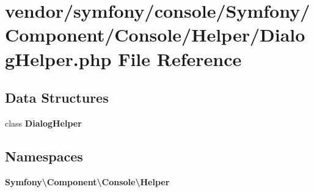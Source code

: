 \section{vendor/symfony/console/\+Symfony/\+Component/\+Console/\+Helper/\+Dialog\+Helper.php File Reference}
\label{symfony_2console_2_symfony_2_component_2_console_2_helper_2_dialog_helper_8php}
\subsection*{Data Structures}
\begin{DoxyCompactItemize}
\item 
class {\bf Dialog\+Helper}
\end{DoxyCompactItemize}
\subsection*{Namespaces}
\begin{DoxyCompactItemize}
\item 
 {\bf Symfony\textbackslash{}\+Component\textbackslash{}\+Console\textbackslash{}\+Helper}
\end{DoxyCompactItemize}
